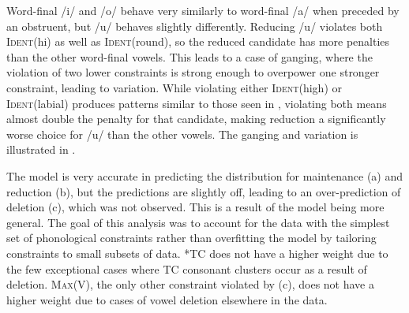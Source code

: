 \documentclass[output=paper,newtxmath,modfonts,nonflat,draftmode]{langsci/langscibook}
\begin{document}
Word-final /i/ and /o/ behave very similarly to word-final /a/ when preceded by 
an obstruent, but /u/ behaves slightly differently. Reducing /u/ violates both 
\textsc{Ident}(hi) as well as \textsc{Ident}(round), so the reduced candidate 
has more penalties than the other word-final vowels. This leads to a case of 
ganging, where the violation of two lower constraints is strong enough to overpower one stronger constraint, leading to variation. While violating either \textsc{Ident}(high) or \textsc{Ident}(labial) produces patterns similar to those seen in , violating both means almost double the penalty for that candidate, making reduction a significantly worse choice for /u/ than the other vowels. The ganging and variation is 
illustrated in . 

\begin{table}
\caption{Tableau for /Tu\#C/ with sample phrase ‘tree wants’, $n=141$}
\label{tab:baird:4}
\footnotesize
{}
\end{table}

The model is very accurate in predicting the distribution for maintenance (a) and reduction (b), but the predictions are slightly off, leading to an over-prediction of deletion (c), which was not observed. This is a result of the model being more general. The goal of this analysis was to account for the data with the simplest set of phonological constraints rather than overfitting the model by tailoring constraints to small subsets of data. *TC does not have a higher weight due to the few exceptional cases where TC consonant clusters occur as a result of deletion. \textsc{Max}(V), the only other constraint violated by (c), does not have a higher weight due to cases of vowel deletion elsewhere in the data. 
\end{document}
